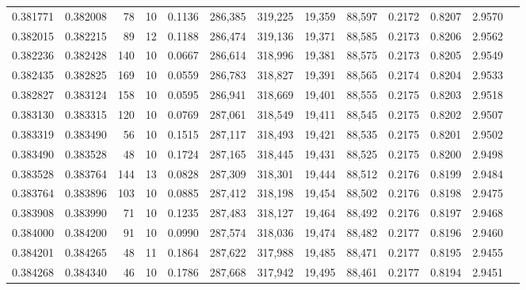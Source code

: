 \begin{tabular}{rrrrrrrrrrrrr}
0.381771 & 0.382008 &    78 &  10 &                                     0.1136 & 286,385 & 319,225 &  19,359 &  88,597 & 0.2172 & 0.8207 & 2.9570 \\
0.382015 & 0.382215 &    89 &  12 &                                     0.1188 & 286,474 & 319,136 &  19,371 &  88,585 & 0.2173 & 0.8206 & 2.9562 \\
0.382236 & 0.382428 &   140 &  10 &                                     0.0667 & 286,614 & 318,996 &  19,381 &  88,575 & 0.2173 & 0.8205 & 2.9549 \\
0.382435 & 0.382825 &   169 &  10 &                                     0.0559 & 286,783 & 318,827 &  19,391 &  88,565 & 0.2174 & 0.8204 & 2.9533 \\
0.382827 & 0.383124 &   158 &  10 &                                     0.0595 & 286,941 & 318,669 &  19,401 &  88,555 & 0.2175 & 0.8203 & 2.9518 \\
0.383130 & 0.383315 &   120 &  10 &                                     0.0769 & 287,061 & 318,549 &  19,411 &  88,545 & 0.2175 & 0.8202 & 2.9507 \\
0.383319 & 0.383490 &    56 &  10 &                                     0.1515 & 287,117 & 318,493 &  19,421 &  88,535 & 0.2175 & 0.8201 & 2.9502 \\
0.383490 & 0.383528 &    48 &  10 &                                     0.1724 & 287,165 & 318,445 &  19,431 &  88,525 & 0.2175 & 0.8200 & 2.9498 \\
0.383528 & 0.383764 &   144 &  13 &                                     0.0828 & 287,309 & 318,301 &  19,444 &  88,512 & 0.2176 & 0.8199 & 2.9484 \\
0.383764 & 0.383896 &   103 &  10 &                                     0.0885 & 287,412 & 318,198 &  19,454 &  88,502 & 0.2176 & 0.8198 & 2.9475 \\
0.383908 & 0.383990 &    71 &  10 &                                     0.1235 & 287,483 & 318,127 &  19,464 &  88,492 & 0.2176 & 0.8197 & 2.9468 \\
0.384000 & 0.384200 &    91 &  10 &                                     0.0990 & 287,574 & 318,036 &  19,474 &  88,482 & 0.2177 & 0.8196 & 2.9460 \\
0.384201 & 0.384265 &    48 &  11 &                                     0.1864 & 287,622 & 317,988 &  19,485 &  88,471 & 0.2177 & 0.8195 & 2.9455 \\
0.384268 & 0.384340 &    46 &  10 &                                     0.1786 & 287,668 & 317,942 &  19,495 &  88,461 & 0.2177 & 0.8194 & 2.9451 \\

\end{tabular}
